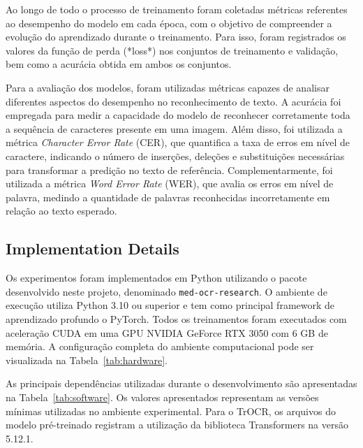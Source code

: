\documentclass[11pt,a4paper]{article}
\begin{document}
Ao longo de todo o processo de treinamento foram coletadas métricas referentes ao desempenho do modelo em cada época, com o objetivo de compreender a evolução do aprendizado durante o treinamento. Para isso, foram registrados os valores da função de perda (*loss*) nos conjuntos de treinamento e validação, bem como a acurácia obtida em ambos os conjuntos.

Para a avaliação dos modelos, foram utilizadas métricas capazes de analisar diferentes aspectos do desempenho no reconhecimento de texto. A acurácia foi empregada para medir a capacidade do modelo de reconhecer corretamente toda a sequência de caracteres presente em uma imagem. Além disso, foi utilizada a métrica \textit{Character Error Rate} (CER), que quantifica a taxa de erros em nível de caractere, indicando o número de inserções, deleções e substituições necessárias para transformar a predição no texto de referência. Complementarmente, foi utilizada a métrica \textit{Word Error Rate} (WER), que avalia os erros em nível de palavra, medindo a quantidade de palavras reconhecidas incorretamente em relação ao texto esperado.

\subsection{Implementation Details}
\label{sec:implementation}

Os experimentos foram implementados em Python utilizando o pacote desenvolvido
neste projeto, denominado \texttt{med-ocr-research}. O ambiente de execução
utiliza Python 3.10 ou superior e tem como principal framework de aprendizado
profundo o PyTorch. Todos os treinamentos foram executados com aceleração CUDA
em uma GPU NVIDIA GeForce RTX 3050 com 6 GB de memória. A configuração completa
do ambiente computacional pode ser visualizada na
Tabela~\ref{tab:hardware}.

As principais dependências utilizadas durante o desenvolvimento são
apresentadas na Tabela~\ref{tab:software}. Os valores apresentados representam
as versões mínimas utilizadas no ambiente experimental. Para o TrOCR, os
arquivos do modelo pré-treinado registram a utilização da biblioteca
Transformers na versão 5.12.1.
\end{document}
